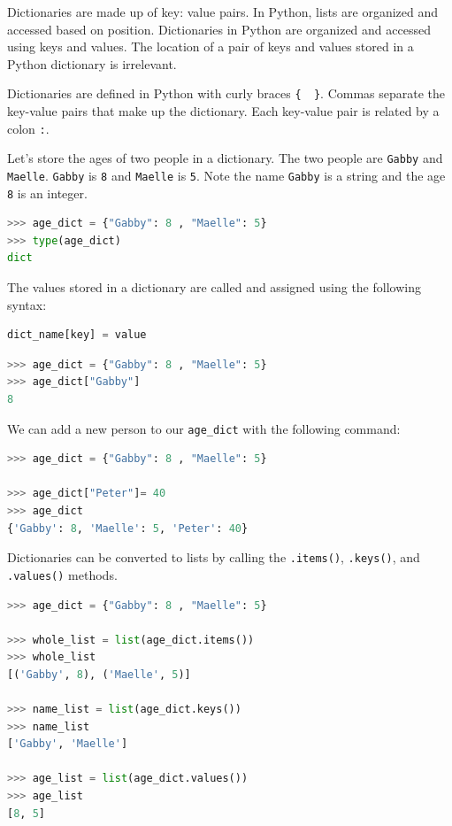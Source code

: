 \documentclass{book}
\begin{document}
    
        Dictionaries are made up of key: value pairs. In Python, lists are
organized and accessed based on position. Dictionaries in Python are
organized and accessed using keys and values. The location of a pair of
keys and values stored in a Python dictionary is irrelevant.

Dictionaries are defined in Python with curly braces \lstinline!{  }!.
Commas separate the key-value pairs that make up the dictionary. Each
key-value pair is related by a colon \lstinline!:!.

Let's store the ages of two people in a dictionary. The two people are
\lstinline!Gabby! and \lstinline!Maelle!. \lstinline!Gabby! is
\lstinline!8! and \lstinline!Maelle! is \lstinline!5!. Note the name
\lstinline!Gabby! is a string and the age \lstinline!8! is an integer.

\begin{lstlisting}[language=Python]
>>> age_dict = {"Gabby": 8 , "Maelle": 5}
>>> type(age_dict)
dict
\end{lstlisting}

The values stored in a dictionary are called and assigned using the
following syntax:

\begin{lstlisting}[language=Python]
dict_name[key] = value
\end{lstlisting}

\begin{lstlisting}[language=Python]
>>> age_dict = {"Gabby": 8 , "Maelle": 5}
>>> age_dict["Gabby"]
8
\end{lstlisting}

We can add a new person to our \lstinline!age_dict! with the following
command:

\begin{lstlisting}[language=Python]
>>> age_dict = {"Gabby": 8 , "Maelle": 5}

>>> age_dict["Peter"]= 40
>>> age_dict
{'Gabby': 8, 'Maelle': 5, 'Peter': 40}
\end{lstlisting}

Dictionaries can be converted to lists by calling the
\lstinline!.items()!, \lstinline!.keys()!, and \lstinline!.values()!
methods.

\begin{lstlisting}[language=Python]
>>> age_dict = {"Gabby": 8 , "Maelle": 5}

>>> whole_list = list(age_dict.items())
>>> whole_list
[('Gabby', 8), ('Maelle', 5)]

>>> name_list = list(age_dict.keys())
>>> name_list
['Gabby', 'Maelle']

>>> age_list = list(age_dict.values())
>>> age_list
[8, 5]
\end{lstlisting}
    
\end{document}
